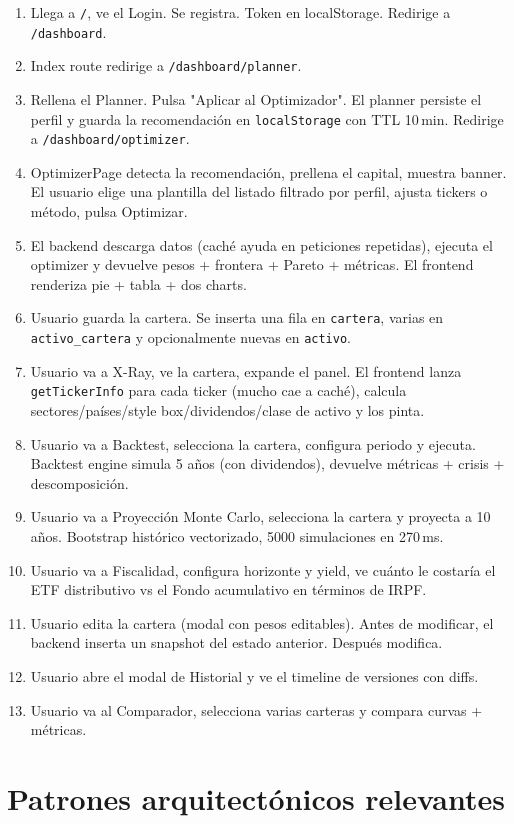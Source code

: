 \documentclass[11pt,a4paper]{book}
\begin{document}
\begin{enumerate}
  \item Llega a \texttt{/}, ve el Login. Se registra. Token en localStorage. Redirige a \texttt{/dashboard}.
  \item Index route redirige a \texttt{/dashboard/planner}.
  \item Rellena el Planner. Pulsa "Aplicar al Optimizador". El planner persiste el perfil y guarda la recomendación en \texttt{localStorage} con TTL 10\,min. Redirige a \texttt{/dashboard/optimizer}.
  \item OptimizerPage detecta la recomendación, prellena el capital, muestra banner. El usuario elige una plantilla del listado filtrado por perfil, ajusta tickers o método, pulsa Optimizar.
  \item El backend descarga datos (caché ayuda en peticiones repetidas), ejecuta el optimizer y devuelve pesos + frontera + Pareto + métricas. El frontend renderiza pie + tabla + dos charts.
  \item Usuario guarda la cartera. Se inserta una fila en \texttt{cartera}, varias en \texttt{activo\_cartera} y opcionalmente nuevas en \texttt{activo}.
  \item Usuario va a X-Ray, ve la cartera, expande el panel. El frontend lanza \texttt{getTickerInfo} para cada ticker (mucho cae a caché), calcula sectores/países/style box/dividendos/clase de activo y los pinta.
  \item Usuario va a Backtest, selecciona la cartera, configura periodo y ejecuta. Backtest engine simula 5 años (con dividendos), devuelve métricas + crisis + descomposición.
  \item Usuario va a Proyección Monte Carlo, selecciona la cartera y proyecta a 10 años. Bootstrap histórico vectorizado, 5000 simulaciones en 270\,ms.
  \item Usuario va a Fiscalidad, configura horizonte y yield, ve cuánto le costaría el ETF distributivo vs el Fondo acumulativo en términos de IRPF.
  \item Usuario edita la cartera (modal con pesos editables). Antes de modificar, el backend inserta un snapshot del estado anterior. Después modifica.
  \item Usuario abre el modal de Historial y ve el timeline de versiones con diffs.
  \item Usuario va al Comparador, selecciona varias carteras y compara curvas + métricas.
\end{enumerate}

\section{Patrones arquitectónicos relevantes}
\end{document}
